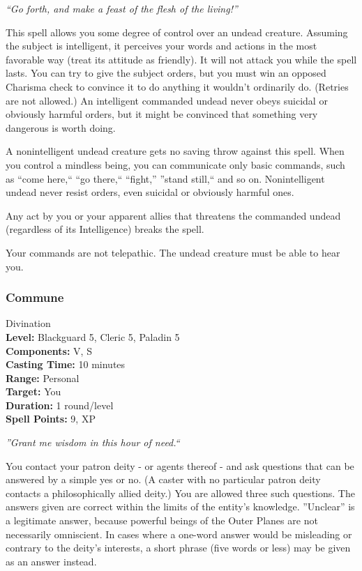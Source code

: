 \emph{``Go forth, and make a feast of the flesh of the living!''}

This spell allows you some degree of control over an undead creature. 
Assuming the subject is intelligent, it perceives your words and actions in the most favorable way (treat its attitude as friendly). 
It will not attack you while the spell lasts. 
You can try to give the subject orders, but you must win an opposed Charisma check to convince it to do anything it wouldn't ordinarily do. (Retries are not allowed.) 
An intelligent commanded undead never obeys suicidal or obviously harmful orders, but it might be convinced that something very dangerous is worth doing.

A nonintelligent undead creature gets no saving throw against this spell. 
When you control a mindless being, you can communicate only basic commands, such as ``come here,`` ``go there,`` ``fight,'' ''stand still,`` and so on. 
Nonintelligent undead never resist orders, even suicidal or obviously harmful ones.

Any act by you or your apparent allies that threatens the commanded undead (regardless of its Intelligence) breaks the spell.

Your commands are not telepathic. The undead creature must be able to hear you.

\subsubsection{Commune}
\label{Spell:Commune}
Divination
\\ \textbf{Level:} Blackguard 5, Cleric 5, Paladin 5
\\ \textbf{Components:} V, S
\\ \textbf{Casting Time:} 10 minutes
\\ \textbf{Range:} Personal
\\ \textbf{Target:} You
\\ \textbf{Duration:} 1 round/level
\\ \textbf{Spell Points:} 9, XP

\emph{''Grant me wisdom in this hour of need.``}

You contact your patron deity - or agents thereof - and ask questions that can be answered by a simple yes or no. 
(A caster with no particular patron deity contacts a philosophically allied deity.) 
You are allowed three such questions. 
The answers given are correct within the limits of the entity's knowledge. 
''Unclear'' is a legitimate answer, because powerful beings of the Outer Planes are not necessarily omniscient. 
In cases where a one-word answer would be misleading or contrary to the deity's interests, 
a short phrase (five words or less) may be given as an answer instead.

